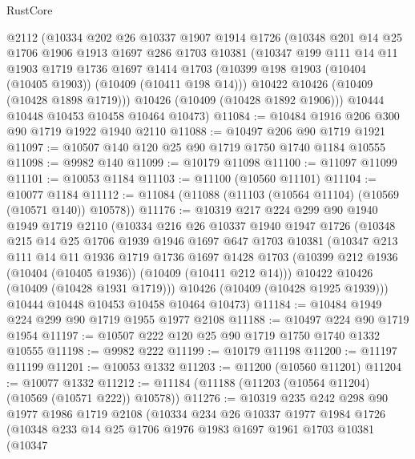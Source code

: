 \begin{lexlean}{RustCore}
\begin{coremodule}
    @2112
    (@10334
      @202
      @26
      @10337
      @1907
      @1914
      @1726
      (@10348
        @201
        @14
        @25
        @1706
        @1906
        @1913
        @1697
        @286
        @1703
        @10381
        (@10347
          @199
          @111
          @14
          @11
          @1903
          @1719
          @1736
          @1697
          @1414
          @1703
          (@10399 @198 @1903 (@10404 (@10405 @1903)) (@10409 (@10411 @198 @14)))
          @10422
          @10426
          (@10409 (@10428 @1898 @1719)))
        @10426
        (@10409 (@10428 @1892 @1906)))
      @10444
      @10448
      @10453
      @10458
      @10464
      @10473)
@11084 := @10484 @1916 @206 @300 @90 @1719 @1922 @1940 @2110
@11088 := @10497 @206 @90 @1719 @1921
@11097 := @10507 @140 @120 @25 @90 @1719 @1750 @1740 @1184 @10555
@11098 := @9982 @140
@11099 := @10179 @11098
@11100 := @11097 @11099
@11101 := @10053 @1184
@11103 := @11100 (@10560 @11101)
@11104 := @10077 @1184
@11112 := @11084 (@11088 (@11103 (@10564 @11104) (@10569 (@10571 @140)) @10578))
@11176 := @10319
    @217
    @224
    @299
    @90
    @1940
    @1949
    @1719
    @2110
    (@10334
      @216
      @26
      @10337
      @1940
      @1947
      @1726
      (@10348
        @215
        @14
        @25
        @1706
        @1939
        @1946
        @1697
        @647
        @1703
        @10381
        (@10347
          @213
          @111
          @14
          @11
          @1936
          @1719
          @1736
          @1697
          @1428
          @1703
          (@10399 @212 @1936 (@10404 (@10405 @1936)) (@10409 (@10411 @212 @14)))
          @10422
          @10426
          (@10409 (@10428 @1931 @1719)))
        @10426
        (@10409 (@10428 @1925 @1939)))
      @10444
      @10448
      @10453
      @10458
      @10464
      @10473)
@11184 := @10484 @1949 @224 @299 @90 @1719 @1955 @1977 @2108
@11188 := @10497 @224 @90 @1719 @1954
@11197 := @10507 @222 @120 @25 @90 @1719 @1750 @1740 @1332 @10555
@11198 := @9982 @222
@11199 := @10179 @11198
@11200 := @11197 @11199
@11201 := @10053 @1332
@11203 := @11200 (@10560 @11201)
@11204 := @10077 @1332
@11212 := @11184 (@11188 (@11203 (@10564 @11204) (@10569 (@10571 @222)) @10578))
@11276 := @10319
    @235
    @242
    @298
    @90
    @1977
    @1986
    @1719
    @2108
    (@10334
      @234
      @26
      @10337
      @1977
      @1984
      @1726
      (@10348
        @233
        @14
        @25
        @1706
        @1976
        @1983
        @1697
        @1961
        @1703
        @10381
        (@10347

\end{coremodule}
\end{lexlean}
